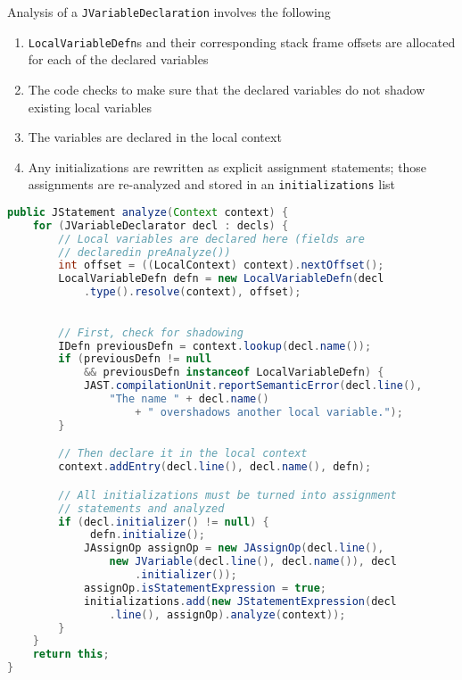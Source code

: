 \documentclass[8pt,a4paper,compress]{beamer}
\begin{document}
\begin{frame}[fragile]
\pause

Analysis of a \lstinline{JVariableDeclaration} involves the following
\begin{enumerate}
\item \lstinline{LocalVariableDefn}s and their corresponding stack frame offsets are allocated for each of the declared variables
\item The code checks to make sure that the declared variables do not shadow existing local variables
\item The variables are declared in the local context
\item Any initializations are rewritten as explicit assignment statements; those assignments are re-analyzed and stored in an \lstinline{initializations} list
\end{enumerate}

\pause
\bigskip

\begin{lstlisting}[language=Java]
public JStatement analyze(Context context) {
    for (JVariableDeclarator decl : decls) {
        // Local variables are declared here (fields are
        // declaredin preAnalyze())
        int offset = ((LocalContext) context).nextOffset();
        LocalVariableDefn defn = new LocalVariableDefn(decl
            .type().resolve(context), offset);
\end{lstlisting}
\end{frame}

\begin{frame}[fragile]
\pause

\begin{lstlisting}[language=Java]

        // First, check for shadowing
        IDefn previousDefn = context.lookup(decl.name());
        if (previousDefn != null
            && previousDefn instanceof LocalVariableDefn) {
            JAST.compilationUnit.reportSemanticError(decl.line(),
                "The name " + decl.name()
                    + " overshadows another local variable.");
        }

        // Then declare it in the local context
        context.addEntry(decl.line(), decl.name(), defn);

        // All initializations must be turned into assignment
        // statements and analyzed
        if (decl.initializer() != null) {
             defn.initialize();
            JAssignOp assignOp = new JAssignOp(decl.line(),
                new JVariable(decl.line(), decl.name()), decl
                    .initializer());
            assignOp.isStatementExpression = true;
            initializations.add(new JStatementExpression(decl
                .line(), assignOp).analyze(context));
        }
    }
    return this;
}
\end{lstlisting}
\end{frame}
\end{document}
